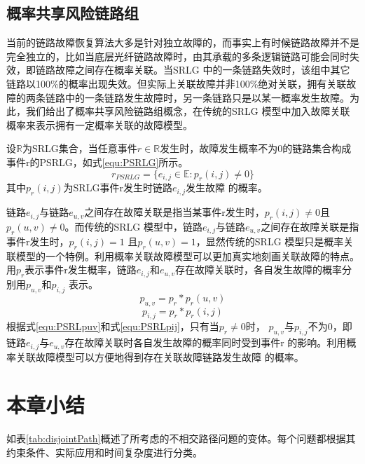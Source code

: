 \subsection{概率共享风险链路组}
当前的链路故障恢复算法大多是针对独立故障的，而事实上有时候链路故障并不是完全独立的，比如当底层光纤链路故障时，由其承载的多条逻辑链路可能会同时失效，即链路故障之间存在概率关联。当SRLG 中的一条链路失效时，该组中其它链路以100\%的概率出现失效。但实际上关联故障并非100\%绝对关联，拥有关联故障的两条链路中的一条链路发生故障时，另一条链路只是以某一概率发生故障。为此，我们给出了概率共享风险链路组概念，在传统的SRLG 模型中加入故障关联概率来表示拥有一定概率关联的故障模型。
\begin{definition}
设$\mathbb{R}$为SRLG集合，当任意事件$r\in\mathbb{R}$发生时，故障发生概率不为0的链路集合构成事件r的PSRLG，如式\ref{equ:PSRLG}所示。
\begin{equation}\label{equ:PSRLG}
  r_{PSRLG}=\{e_{i,j}\in \mathbb{E}:p_r(i,j)\neq 0\}
\end{equation}
其中$p_r(i,j)$为SRLG事件r发生时链路$e_{i,j}$发生故障
的概率。
\end{definition}
链路$e_{i,j}$与链路$e_{u,v}$之间存在故障关联是指当某事件r发生时，$p_r(i,j)\neq 0$且$p_r(u,v)\neq 0$。而传统的SRLG 模型中，链路$e_{i,j}$与链路$e_{u,v}$之间存在故障关联是指事件r发生时，$p_r(i,j)=1$ 且$p_r(u,v)=1$，显然传统的SRLG 模型只是概率关联模型的一个特例。利用概率关联故障模型可以更加真实地刻画关联故障的特点。用$p_r$表示事件r发生概率，链路$e_{i,j}$和$e_{u,v}$存在故障关联时，各自发生故障的概率分别用$p_{u,v}$和$p_{i,j}$
表示。
\begin{equation}\label{equ:PSRLpuv}
  p_{u,v}=p_r*p_r(u,v)
\end{equation}
\begin{equation}\label{equ:PSRLpij}
  p_{i,j}=p_r*p_r(i,j)
\end{equation}
根据式\ref{equ:PSRLpuv}和式\ref{equ:PSRLpij}，只有当$p_r\neq 0$时， $p_{u,v}$与$p_{i,j}$不为0，即链路$e_{i,j}$与$e_{u,v}$存在故障关联时各自发生故障的概率同时受到事件r 的影响。利用概率关联故障模型可以方便地得到存在关联故障链路发生故障
的概率。

\section{本章小结}
如表\ref{tab:disjointPath}概述了所考虑的不相交路径问题的变体。每个问题都根据其约束条件、实际应用和时间复杂度进行分类。

